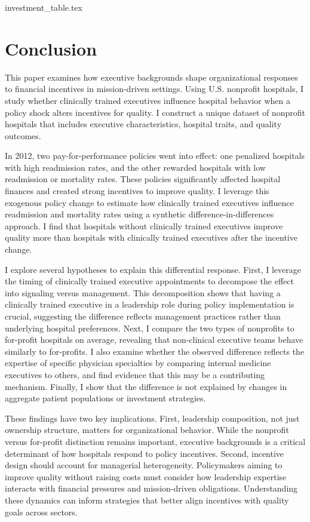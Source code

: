 \documentclass[12pt]{article}
\begin{document}
    {investment_table.tex}


    \section{Conclusion}

    This paper examines how executive backgrounds shape organizational responses to financial incentives in mission-driven settings. Using U.S. nonprofit hospitals, I study whether clinically trained executives influence hospital behavior when a policy shock alters incentives for quality. I construct a unique dataset of nonprofit hospitals that includes executive characteristics, hospital traits, and quality outcomes.

    In 2012, two pay-for-performance policies went into effect: one penalized hospitals with high readmission rates, and the other rewarded hospitals with low readmission or mortality rates. These policies significantly affected hospital finances and created strong incentives to improve quality. I leverage this exogenous policy change to estimate how clinically trained executives influence readmission and mortality rates using a synthetic difference-in-differences approach. I find that hospitals without clinically trained executives improve quality more than hospitals with clinically trained executives after the incentive change.
    
    I explore several hypotheses to explain this differential response. First, I leverage the timing of clinically trained executive appointments to decompose the effect into signaling versus management. This decomposition shows that having a clinically trained executive in a leadership role during policy implementation is crucial, suggesting the difference reflects management practices rather than underlying hospital preferences. Next, I compare the two types of nonprofits to for-profit hospitals on average, revealing that non-clinical executive teams behave similarly to for-profits. I also examine whether the observed difference reflects the expertise of specific physician specialties by comparing internal medicine executives to others, and find evidence that this may be a contributing mechanism. Finally, I show that the difference is not explained by changes in aggregate patient populations or investment strategies.

    These findings have two key implications. First, leadership composition, not just ownership structure, matters for organizational behavior. While the nonprofit versus for-profit distinction remains important, executive backgrounds is a critical determinant of how hospitals respond to policy incentives. Second, incentive design should account for managerial heterogeneity. Policymakers aiming to improve quality without raising costs must consider how leadership expertise interacts with financial pressures and mission-driven obligations. Understanding these dynamics can inform strategies that better align incentives with quality goals across sectors.
\end{document}
